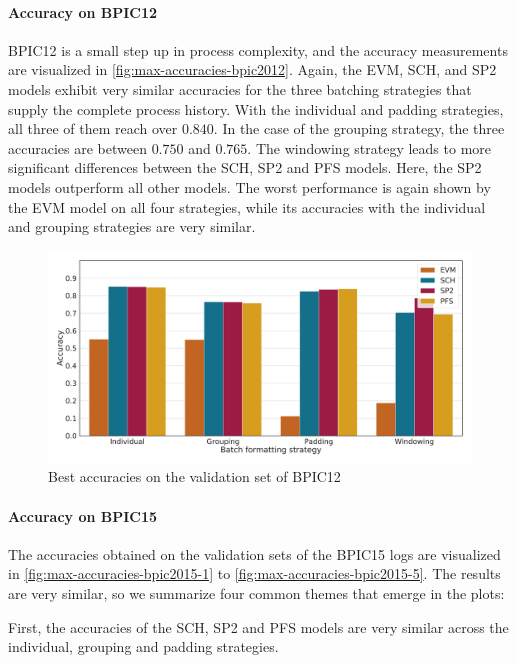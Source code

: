 \paragraph{Accuracy on BPIC12}
BPIC12 is a small step up in process complexity, and the accuracy measurements are visualized in \autoref{fig:max-accuracies-bpic2012}.
Again, the EVM, SCH, and SP2 models exhibit very similar accuracies for the three batching strategies that supply the complete process history.
With the individual and padding strategies, all three of them reach over $0.840$.
In the case of the grouping strategy, the three accuracies are between $0.750$ and $0.765$.
The windowing strategy leads to more significant differences between the SCH, SP2 and PFS models.
Here, the SP2 models outperform all other models.
The worst performance is again shown by the EVM model on all four strategies, while its accuracies with the individual and grouping strategies are very similar.

\begin{figure}[!htb]
    \centering
    \includegraphics[width=\textwidth]{gfx/bpic2012/accuracies.pdf}
    \caption{Best accuracies on the validation set of BPIC12}
    \label{fig:max-accuracies-bpic2012}
\end{figure}

\paragraph{Accuracy on BPIC15}
The accuracies obtained on the validation sets of the BPIC15 logs are visualized in \autoref{fig:max-accuracies-bpic2015-1} to \autoref{fig:max-accuracies-bpic2015-5}.
The results are very similar, so we summarize four common themes that emerge in the plots:

First, the accuracies of the SCH, SP2 and PFS models are very similar across the individual, grouping and padding strategies.

